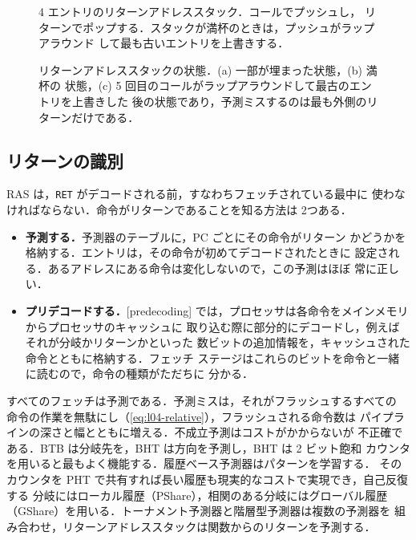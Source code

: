 \documentclass[../main.tex]{subfiles}
\begin{document}
\begin{figure}[htbp]
  \centering
  
  \caption{4 エントリのリターンアドレススタック．コールでプッシュし，
    リターンでポップする．スタックが満杯のときは，プッシュがラップアラウンド
    して最も古いエントリを上書きする．}
  \label{fig:l04-ras}
\end{figure}

\begin{figure}[htbp]
  \centering
  
  \caption{リターンアドレススタックの状態．(a) 一部が埋まった状態，(b) 満杯の
    状態，(c) 5 回目のコールがラップアラウンドして最古のエントリを上書きした
    後の状態であり，予測ミスするのは最も外側のリターンだけである．}
  \label{fig:l04-ras-states}
\end{figure}

\subsection{リターンの識別}

RAS は，\texttt{RET} がデコードされる前，すなわちフェッチされている最中に
使わなければならない．命令がリターンであることを知る方法は 2つある．
\begin{itemize}
  \item \textbf{予測する．}予測器のテーブルに，PC ごとにその命令がリターン
    かどうかを格納する．エントリは，その命令が初めてデコードされたときに
    設定される．あるアドレスにある命令は変化しないので，この予測はほぼ
    常に正しい．
  \item \textbf{プリデコードする．}[predecoding]%
    では，プロセッサは各命令をメインメモリからプロセッサのキャッシュに
    取り込む際に部分的にデコードし，例えばそれが分岐かリターンかといった
    数ビットの追加情報を，キャッシュされた命令とともに格納する．フェッチ
    ステージはこれらのビットを命令と一緒に読むので，命令の種類がただちに
    分かる．
\end{itemize}

\begin{keypoint}[章のまとめ]
  すべてのフェッチは予測である．予測ミスは，それがフラッシュするすべての
  命令の作業を無駄にし（\cref{eq:l04-relative}），フラッシュされる命令数は
  パイプラインの深さと幅とともに増える．不成立予測はコストがかからないが
  不正確である．BTB は分岐先を，BHT は方向を予測し，BHT は 2 ビット飽和
  カウンタを用いると最もよく機能する．履歴ベース予測器はパターンを学習する．
  そのカウンタを PHT で共有すれば長い履歴も現実的なコストで実現でき，自己反復する
  分岐にはローカル履歴（PShare），相関のある分岐にはグローバル履歴
  （GShare）を用いる．トーナメント予測器と階層型予測器は複数の予測器を
  組み合わせ，リターンアドレススタックは関数からのリターンを予測する．
\end{keypoint}
\end{document}
